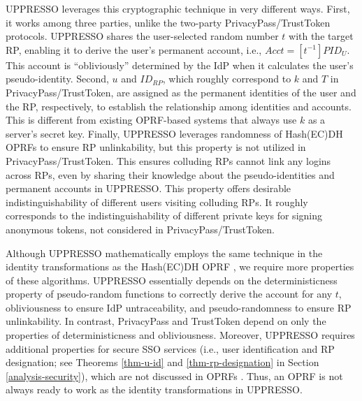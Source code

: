 UPPRESSO leverages this cryptographic technique in very different ways.
First, 
it works among three parties, unlike the two-party PrivacyPass/TrustToken protocols.
UPPRESSO shares the user-selected random number $t$ with the target RP,
enabling it to derive the user's permanent account, i.e., $Acct = [t^{-1}]PID_{U}$. This account is ``obliviously'' determined by the IdP when it calculates the user's pseudo-identity.
Second, $u$ and $ID_{RP}$, which roughly correspond to $k$ and $T$ in PrivacyPass/TrustToken, are assigned as the permanent identities of the user and the RP, respectively, to establish the relationship among identities and accounts.
This is different from existing OPRF-based systems  \cite{privacypass, trusttoken, strong-oprf, oprf-bitcoin-wallet, pesto, oprf-ot-si, pp-ss, Private-Contact-Discovery, o-kms, oprf-deduplication} that always use $k$ as a server's secret key.
Finally, UPPRESSO leverages randomness of Hash(EC)DH OPRFs to ensure RP unlinkability, but this property is not utilized in PrivacyPass/TrustToken.
This ensures colluding RPs cannot link any logins across RPs,
even by sharing their knowledge about the pseudo-identities and permanent accounts in UPPRESSO.
This property offers desirable indistinguishability of different users visiting colluding RPs.
It roughly corresponds to the indistinguishability of different private keys for signing anonymous tokens, not considered in PrivacyPass/TrustToken. 

Although UPPRESSO mathematically employs the same technique in the identity transformations as the Hash(EC)DH OPRF \cite{oprf-proved,voprf-proved}, we require more properties of these algorithms. %
UPPRESSO essentially 
depends on the deterministicness property of pseudo-random functions to correctly derive the account for any $t$, obliviousness to ensure IdP untraceability, 
and pseudo-randomness to ensure RP unlinkability. 
In contrast, PrivacyPass and TrustToken \cite{privacypass,trusttoken} depend on only the properties of deterministicness and obliviousness.
Moreover, UPPRESSO requires additional properties for secure SSO services (i.e., user identification and RP designation; see Theorems \ref{thm-u-id} and \ref{thm-rp-designation} in Section \ref{analysis-security}),
    which are not discussed in OPRFs \cite{sok-oprf,oprf-proved,voprf-proved}.
Thus, an OPRF is not always ready to work as the identity transformations in UPPRESSO.

